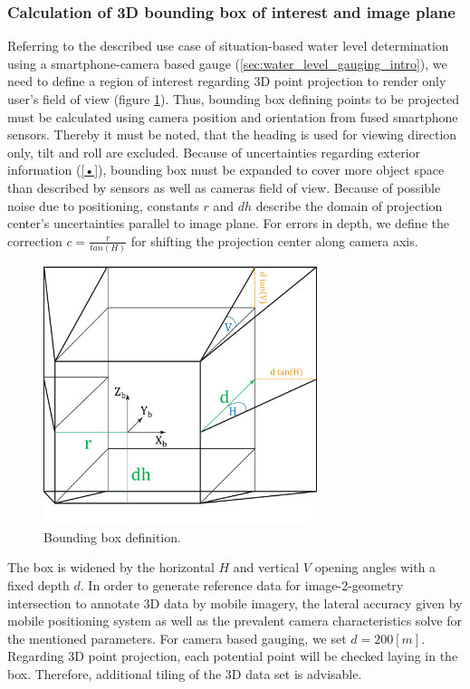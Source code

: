 \documentclass[review]{elsarticle}
\begin{document}
\subsubsection{Calculation of 3D bounding box of interest and image plane}
Referring to the described use case of situation-based water level determination using a smartphone-camera based gauge (\ref{sec:water_level_gauging_intro}), we need to define a region of interest regarding 3D point projection to render only user's field of view (figure \ref{fig:4_3_bounding_box}). Thus, bounding box defining points to be projected must be calculated using camera position and orientation from fused smartphone sensors. Thereby it must be noted, that the heading is used for viewing direction only, tilt and roll are excluded. Because of uncertainties regarding exterior information (\ref{•}), bounding box must be expanded to cover more object space than described by sensors as well as cameras field of view. Because of possible noise due to positioning, constants $r$ and $dh$ describe the domain of projection center's uncertainties parallel to image plane. For errors in depth, we define the correction $c = \frac{r}{tan(H)}$ for shifting the projection center along camera axis. 
\begin{figure}[h]
\centering
\includegraphics[width=8cm]{graphics/4_3_Bounding_Box}
\caption{Bounding box definition.}
\label{fig:4_3_bounding_box}
\end{figure}
The box is widened by the horizontal $H$ and vertical $V$ opening angles with a fixed depth $d$. In order to generate reference data for image-2-geometry intersection to annotate 3D data by mobile imagery, the lateral accuracy given by mobile positioning system as well as the prevalent camera characteristics solve for the mentioned parameters. For camera based gauging, we set $d = 200 [m]$. Regarding 3D point projection, each potential point will be checked laying in the box. Therefore, additional tiling of the 3D data set is advisable.
\end{document}
